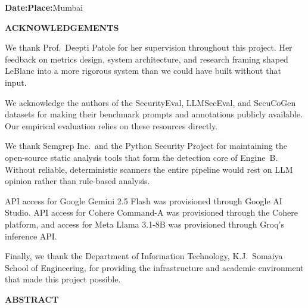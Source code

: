 \documentclass[12pt,a4paper]{report}
\begin{document}
\vspace{0.3in}
\noindent\textbf{Date:}\enspace\underline{\hspace{1.8in}}\hfill\textbf{Place:}\enspace Mumbai

\newpage
\thispagestyle{empty}
\begin{center}
  {\Large\bfseries ACKNOWLEDGEMENTS}
\end{center}

\vspace{0.25in}
\noindent We thank Prof.\ Deepti Patole for her supervision throughout this project.
Her feedback on metrics design, system architecture, and research framing shaped
LeBlanc into a more rigorous system than we could have built without that input.

\vspace{0.15in}
\noindent We acknowledge the authors of the SecurityEval, LLMSecEval, and SecuCoGen
datasets for making their benchmark prompts and annotations publicly available.
Our empirical evaluation relies on these resources directly.

\vspace{0.15in}
\noindent We thank Semgrep Inc.\ and the Python Security Project for maintaining
the open-source static analysis tools that form the detection core of Engine~B.
Without reliable, deterministic scanners the entire pipeline would rest on LLM
opinion rather than rule-based analysis.

\vspace{0.15in}
\noindent API access for Google Gemini 2.5 Flash was provisioned through Google
AI Studio. API access for Cohere Command-A was provisioned through the Cohere
platform, and access for Meta Llama 3.1-8B was provisioned through Groq's
inference API.

\vspace{0.15in}
\noindent Finally, we thank the Department of Information Technology, K.J.\
Somaiya School of Engineering, for providing the infrastructure and academic
environment that made this project possible.

\newpage
\thispagestyle{empty}
\begin{center}
  {\Large\bfseries ABSTRACT}
\end{center}
\end{document}
